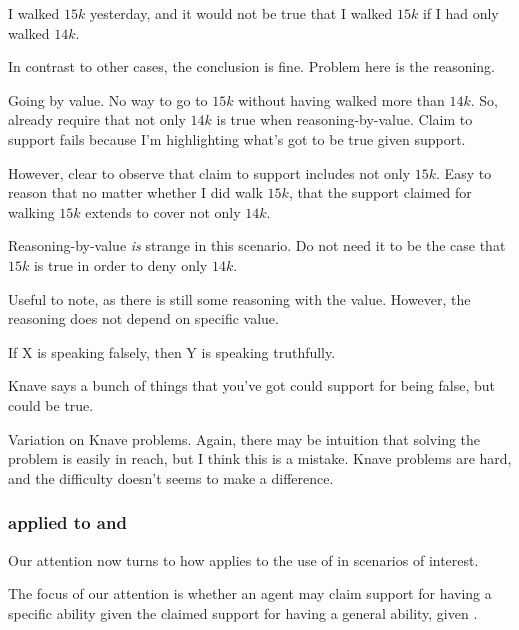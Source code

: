\begin{note}[Problematic]
  \begin{scenario}
    I walked \(15k\) yesterday, and it would not be true that I walked \(15k\) if I had only walked \(14k\).
  \end{scenario}
  In contrast to other cases, the conclusion is fine.
  Problem here is the reasoning.

  Going by value.
  No way to go to \(15k\) without having walked more than \(14k\).
  So, already require that not only \(14k\) is true when reasoning-by-value.
  Claim to support fails because I'm highlighting what's got to be true given support.

  However, clear to observe that claim to support includes not only \(15k\).
  Easy to reason that no matter whether I did walk \(15k\), that the support claimed for walking \(15k\) extends to cover not only \(14k\).

  Reasoning-by-value \emph{is} strange in this scenario.
  Do not need it to be the case that \(15k\) is true in order to deny only \(14k\).


  Useful to note, as there is still some reasoning with the value.
  However, the reasoning does not depend on specific value.
\end{note}

\begin{note}[Knaves]
  \begin{scenario}
    If X is speaking falsely, then Y is speaking truthfully.

    Knave says a bunch of things that you've got could support for being false, but could be true.
  \end{scenario}
  Variation on Knave problems.
  Again, there may be intuition that solving the problem is easily in reach, but I think this is a mistake.
  Knave problems are hard, and the difficulty doesn't seems to make a difference.
\end{note}

\newpage

\subsubsection{\nI{} applied to \gsi{} and \AR{}}
\label{sec:ni-applies-ar}

\begin{note}
  Our attention now turns to how \nI{} applies to the use of \aben{} in scenarios of interest.

  The focus of our attention is whether an agent may claim support for having a specific ability given the claimed support for having a general ability, given \gsi{}.
\end{note}

